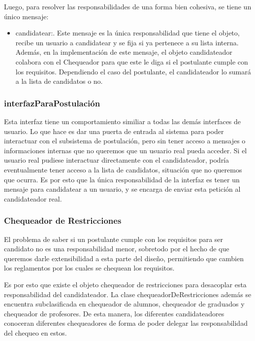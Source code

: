 Luego, para resolver las responsabilidades de una forma bien cohesiva, se tiene un \'unico mensaje:

\begin{itemize}
\item candidatear:. Este mensaje es la \'unica responsabilidad que tiene el objeto, recibe un usuario a candidatear y se fija si ya pertenece a su lista interna. Adem\'as, en la implementaci\'on de este mensaje, el objeto candidateador colabora con el Chequeador para que este le diga si el postulante cumple con los requisitos. Dependiendo el caso del postulante, el candidateador lo sumar\'a a la lista de candidatos o no.
\end{itemize}


\subsubsection{interfazParaPostulaci\'on}

Esta interfaz tiene un comportamiento similiar a todas las dem\'as interfaces de usuario. Lo que hace es dar una puerta de entrada al sistema para poder interactuar con el subsistema de postulaci\'on, pero sin tener acceso a mensajes o informaciones internas que no queremos que un usuario real pueda acceder. Si el usuario real pudiese interactuar directamente con el candidateador, podr\'ia eventualmente tener acceso a la lista de candidatos, situaci\'on que no queremos que ocurra. Es por esto que la \'unica responsabilidad de la interfaz es tener un mensaje para candidatear a un usuario, y se encarga de enviar esta petici\'on al candidateador real.


\subsubsection{Chequeador de Restricciones}

El problema de saber si un postulante cumple con los requisitos para ser candidato no es una responsabilidad menor, sobretodo por el hecho de que queremos darle extensibilidad a esta parte del diseño, permitiendo que cambien los reglamentos por los cuales se chequean los requisitos.

Es por esto que existe el objeto chequeador de restricciones para desacoplar esta responsabilidad del candidateador. La clase chequeadorDeRestricciones adem\'as se encuentra subclasificada en chequeador de alumnos, chequeador de graduados y chequeador de profesores. De esta manera, los diferentes candidateadores conoceran diferentes chequeadores de forma de poder delegar las responsabilidad del chequeo en estos.

